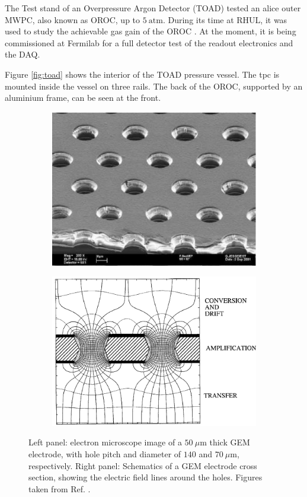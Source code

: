 The Test stand of an Overpressure Argon Detector (TOAD) tested an \gls{alice} outer MWPC, also known as OROC, up to $5~\mathrm{atm}$. During its time at RHUL, it was used to study the achievable gas gain of the OROC \cite{Ritchie-Yates2023}. At the moment, it is being commissioned at Fermilab for a full detector test of the readout electronics and the DAQ.

Figure \ref{fig:toad} shows the interior of the TOAD pressure vessel. The \gls{tpc} is mounted inside the vessel on three rails. The back of the OROC, supported by an aluminium frame, can be seen at the front.

\begin{figure}[h!]
	\begin{subfigure}{0.49\textwidth}
		\centering
		\includegraphics[width=.90\linewidth]{Images/ND-GAr/GEM_photo.jpg}
	\end{subfigure}
	\begin{subfigure}{0.49\textwidth}
		\centering
		\includegraphics[width=.90\linewidth]{Images//ND-GAr/GEM_diagram.pdf}
	\end{subfigure}
	\caption[Electron microscope image and schematic diagram of a GEM electrode.]{Left panel: electron microscope image of a $50~\mu\mathrm{m}$ thick GEM electrode, with hole pitch and diameter of $140$ and $70~\mu\mathrm{m}$, respectively. Right panel: Schematics of a GEM electrode cross section, showing the electric field lines around the holes. Figures taken from Ref. \cite{Sauli2016}.}
	\label{fig:gem}
\end{figure}

